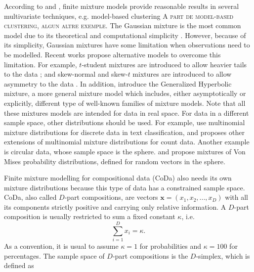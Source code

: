 \documentclass[10pt, a4paper]{article}
\begin{document}
According to \cite{scott1971clustering} and \cite{mclachlan2000finite}, finite mixture models provide reasonable results in several multivariate techniques, e.g. model-based clustering \citep{banfield1993model,  fraley2002model}  \textsc{\color{red}A part de model-based clustering, algun altre exemple}.
The Gaussian mixture is the most common model due to its theoretical and computational simplicity \citep{mclachlan2000finite}. 
However, because of its simplicity, Gaussian mixtures have some limitation when observations need to be modelled.
%
%
%
Recent works  propose alternative models to overcome this limitation. For example, $t$-student mixtures are introduced to allow heavier tails to the data \citep{andrews2012model, lee2013finite, lin2010robust}; and skew-normal and skew-$t$ mixtures are introduced to allow asymmetry to the data \citep{lee2011fitting}. In addition, \cite{browne2013mixture} introduce the Generalized Hyperbolic mixture, a more general mixture model which includes, either asymptotically or explicitly, different type of well-known families of mixture models. Note that all these mixtures models are intended for data in real space. For data in a different sample space, other distributions should be used. 
For example, \cite{bickel2004multi} use multinomial mixture distributions for discrete data in text classification, and  
 \cite[][]{bouguila2011count} proposes other extensions of multinomial mixture distributions for count data. 
Another example is circular data, whose sample space is the sphere.  \cite{banerjee2005clustering} and \cite{mardia2007protein} propose mixtures of Von Mises probability distributions, defined for random vectors in the sphere.

Finite mixture modelling for compositional data (CoDa) also needs its own mixture distributions because this type of data has a constrained sample space.
CoDa, also called $D$-part compositions, are vectors $\textbf{x} = (x_1, x_2, ..., x_D)$ with all its components strictly positive  and carrying only relative information. A $D$-part composition is usually restricted to sum a fixed constant $\kappa$, i.e.
\begin{equation}
\sum_{i=1 }^D x_i = \kappa.
\label{sum_to_constant}
\end{equation}
As a convention, it is usual to assume $\kappa =1$ for probabilities and $\kappa = 100$ for percentages. The sample space of $D$-part compositions is the $D$-simplex, which is defined as
\end{document}
